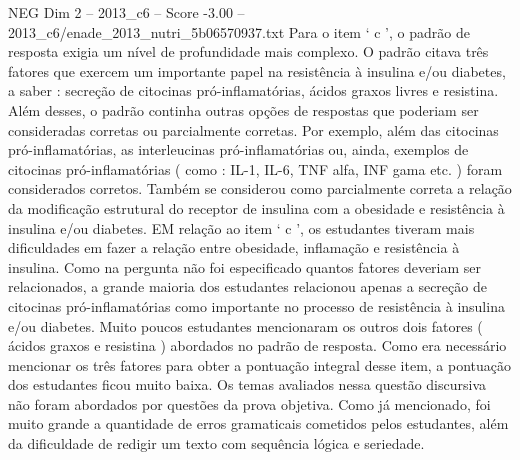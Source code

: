 \begin{textsample}{NEG Dim 2 – 2013\_c6 – Score -3.00 – 2013\_c6/enade\_2013\_nutri\_5b06570937.txt}
Para o item ‘ c ’, o padrão de resposta exigia um nível de profundidade mais complexo.
O padrão citava três fatores que exercem um importante papel na resistência à insulina e/ou diabetes, a saber : secreção de citocinas pró-inflamatórias, ácidos graxos livres e resistina.
Além desses, o padrão continha outras opções de respostas que poderiam ser consideradas corretas ou parcialmente corretas.
Por exemplo, além das citocinas pró-inflamatórias, as interleucinas pró-inflamatórias ou, ainda, exemplos de citocinas pró-inflamatórias ( como : IL-1, IL-6, TNF alfa, INF gama etc. ) foram considerados corretos.
Também se considerou como parcialmente correta a relação da modificação estrutural do receptor de insulina com a obesidade e resistência à insulina e/ou diabetes.
EM relação ao item ‘ c ’, os estudantes tiveram mais dificuldades em fazer a relação entre obesidade, inflamação e resistência à insulina.
Como na pergunta não foi especificado quantos fatores deveriam ser relacionados, a grande maioria dos estudantes relacionou apenas a secreção de citocinas pró-inflamatórias como importante no processo de resistência à insulina e/ou diabetes.
Muito poucos estudantes mencionaram os outros dois fatores ( ácidos graxos e resistina ) abordados no padrão de resposta.
Como era necessário mencionar os três fatores para obter a pontuação integral desse item, a pontuação dos estudantes ficou muito baixa.
Os temas avaliados nessa questão discursiva não foram abordados por questões da prova objetiva.
Como já mencionado, foi muito grande a quantidade de erros gramaticais cometidos pelos estudantes, além da dificuldade de redigir um texto com sequência lógica e seriedade.

\end{textsample}
